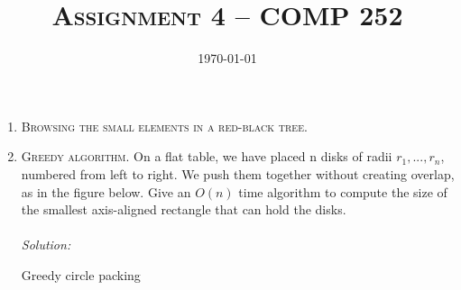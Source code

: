 \documentclass[12pt]{article}
\title{\textsc{Assignment 4 -- COMP 252}}
\author{\it \nameone \nametwo}
\date{\today}
\theoremstyle{definition}
\theoremstyle{remark}
\newcommand\sol{%
  \\ 
  \\
  \textit{Solution:}\\%
}
\begin{document}
\maketitle 
\thispagestyle{empty} %
\begin{enumerate}
  \item \textsc{Browsing the small elements in a red-black tree}.
  \newpage 
  \item \textsc{Greedy algorithm}. On a flat table, we have placed n disks of radii $r_1, ..., r_n$, numbered from left to right. We push them together without creating overlap, as in the figure below. Give an $O(n)$ time algorithm to compute the size of the smallest axis-aligned rectangle that can hold the disks.
  \sol 

  \begin{algorithm}
    \caption{Greedy circle packing}

    \BlankLine

    \BlankLine


\end{algorithm}
\end{enumerate}
\end{document}
